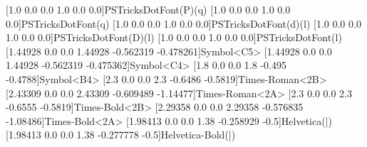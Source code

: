 %
[1.0 0.0 0.0 1.0 0.0 0.0]{PSTricksDotFont}{(P)}{(q)}
%
[1.0 0.0 0.0 1.0 0.0 0.0]{PSTricksDotFont}{(q)}
%
[1.0 0.0 0.0 1.0 0.0 0.0]{PSTricksDotFont}{(d)}{(l)}
%
[1.0 0.0 0.0 1.0 0.0 0.0]{PSTricksDotFont}{(D)}{(l)}
%
[1.0 0.0 0.0 1.0 0.0 0.0]{PSTricksDotFont}{(l)}
%
[1.44928 0.0 0.0 1.44928 -0.562319 -0.478261]{Symbol}{<C5>}
%
[1.44928 0.0 0.0 1.44928 -0.562319 -0.475362]{Symbol}{<C4>}
%
[1.8 0.0 0.0 1.8 -0.495 -0.4788]{Symbol}{<B4>}
\newpsfontdot{+}%
[2.3 0.0 0.0 2.3 -0.6486 -0.5819]{Times-Roman}{<2B>}
%
[2.43309 0.0 0.0 2.43309 -0.609489 -1.14477]{Times-Roman}{<2A>}
%
[2.3 0.0 0.0 2.3 -0.6555 -0.5819]{Times-Bold}{<2B>}
%
[2.29358 0.0 0.0 2.29358 -0.576835 -1.08486]{Times-Bold}{<2A>}
\newpsfontdot{|}%
[1.98413 0.0 0.0 1.38 -0.258929 -0.5]{Helvetica}{(|)}
%
[1.98413 0.0 0.0 1.38 -0.277778 -0.5]{Helvetica-Bold}{(|)}
\iffalse
\newpsfontdot{*}%
[2.77778 0.0 0.0 2.77778 -0.638889 -0.813889]{Symbol}{<B7>}
\newpsfontdot{o}%
[3.33333 0.0 0.0 3.33333 -0.666667 -1.78167]{Symbol}{<B0>}
\newpsfontdot{Bo}%
[4.69484 0.0 0.0 4.69484 -0.78169 -2.97418]{Times-Bold}{<CA>}
\fi
\newdimen\pslinearc
\def\psset@linearc#1{\pssetlength\pslinearc{#1}}
\psset@linearc{0pt}
\def\psline{\pst@object{psline}}
\def\psline@i{%
\pst@getarrows{%
\begin@OpenObj
\pst@getcoors[\psline@ii}}
\def\psline@ii{%
\addto@pscode{\pst@cp \psline@iii \tx@Line}%
\end@OpenObj}
\def\psline@iii{%
\ifdim\pslinearc>\z@
/r \pst@number\pslinearc def
/Lineto { \tx@Arcto } def
\else
/Lineto /lineto load def
\fi
\ifshowpoints true \else false \fi}
\def\qline(#1)(#2){%
\def\pst@par{}%
\begin@SpecialObj
\def\pst@linetype{0}%
\pst@getcoor{#1}\pst@tempa
\pst@@getcoor{#2}%
\addto@pscode{%
\pst@tempa moveto \pst@coor L
\@nameuse{psls@\pslinestyle}}%
\end@SpecialObj}
\def\pspolygon{\pst@object{pspolygon}}
